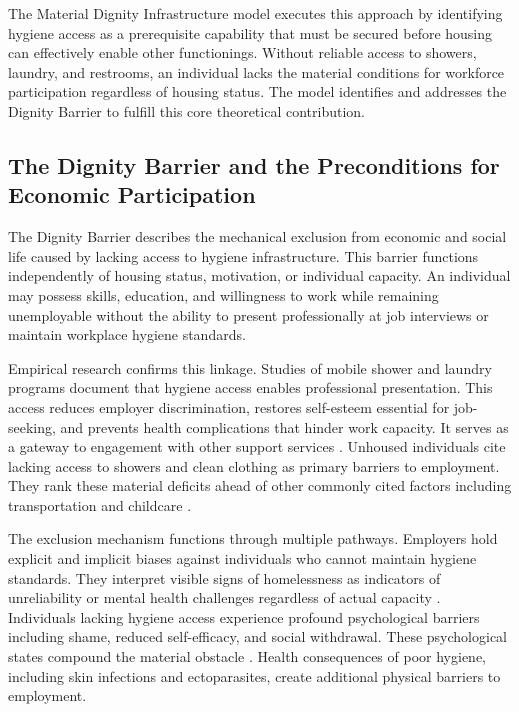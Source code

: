 \documentclass[12pt, letterpaper]{article}
\begin{document}
The Material Dignity Infrastructure model executes this approach by identifying hygiene access as a prerequisite capability that must be secured before housing can effectively enable other functionings. Without reliable access to showers, laundry, and restrooms, an individual lacks the material conditions for workforce participation regardless of housing status. The model identifies and addresses the Dignity Barrier to fulfill this core theoretical contribution.

\subsection{The Dignity Barrier and the Preconditions for Economic Participation}

The Dignity Barrier describes the mechanical exclusion from economic and social life caused by lacking access to hygiene infrastructure. This barrier functions independently of housing status, motivation, or individual capacity. An individual may possess skills, education, and willingness to work while remaining unemployable without the ability to present professionally at job interviews or maintain workplace hygiene standards.

Empirical research confirms this linkage. Studies of mobile shower and laundry programs document that hygiene access enables professional presentation. This access reduces employer discrimination, restores self-esteem essential for job-seeking, and prevents health complications that hinder work capacity. It serves as a gateway to engagement with other support services \citep{share_community_2024, simply_the_basics_2024}. Unhoused individuals cite lacking access to showers and clean clothing as primary barriers to employment. They rank these material deficits ahead of other commonly cited factors including transportation and childcare \citep{nih_2024}.

The exclusion mechanism functions through multiple pathways. Employers hold explicit and implicit biases against individuals who cannot maintain hygiene standards. They interpret visible signs of homelessness as indicators of unreliability or mental health challenges regardless of actual capacity \citep{oregon_business_2024}. Individuals lacking hygiene access experience profound psychological barriers including shame, reduced self-efficacy, and social withdrawal. These psychological states compound the material obstacle \citep{portland_state_2024}. Health consequences of poor hygiene, including skin infections and ectoparasites, create additional physical barriers to employment.
\end{document}
